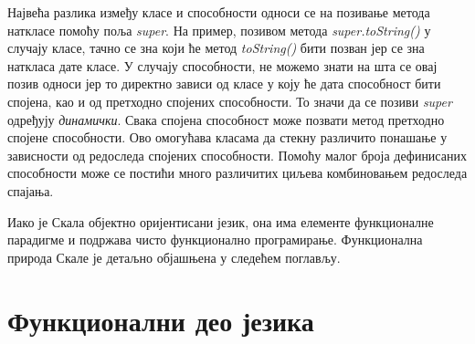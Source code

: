 \documentclass[12pt,oneside]{memoir}
\begin{document}
\begin{description}
Највећа разлика између класе и способности односи се на позивање метода наткласе помоћу поља \textit{super}. На пример, позивом метода \textit{super.toString()} у случају класе, тачно се зна који ће метод \textit{toString()} бити позван јер се зна наткласа дате класе. У случају способности, не можемо знати на шта се овај позив односи јер то директно зависи од класе у коју ће дата способност бити спојена, као и од претходно спојених способности. То значи да се позиви \textit{super} одређују \textit{динамички}. Свака спојена способност може позвати метод претходно спојене способности. Ово омогућава класама да стекну различито понашање у зависности од редоследа спојених способности. Помоћу малог броја дефинисаних способности може се постићи много различитих циљева комбиновањем редоследа спајања.

\end{description}
\par Иако је Скала објектно оријентисани језик, она има елементе функционалне парадигме и подржава чисто функционално програмирање. Функционална природа Скале је детаљно објашњена у следећем поглављу.

\section{Функционални део језика}
\label{sec:funkDeoJezika}
\end{document}

